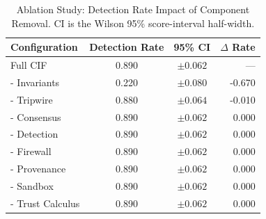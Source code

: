 \begin{table}[htbp]
\centering
\caption{Ablation Study: Detection Rate Impact of Component Removal. CI is the Wilson 95\% score-interval half-width.}
\label{tab:ablation}
\begin{tabular}{lccr}
\toprule
Configuration & Detection Rate & 95\% CI & $\Delta$ Rate \\
\midrule
Full CIF & 0.890 & $\pm 0.062$ & --- \\
\midrule
- Invariants & 0.220 & $\pm 0.080$ & -0.670 \\
- Tripwire & 0.880 & $\pm 0.064$ & -0.010 \\
- Consensus & 0.890 & $\pm 0.062$ & 0.000 \\
- Detection & 0.890 & $\pm 0.062$ & 0.000 \\
- Firewall & 0.890 & $\pm 0.062$ & 0.000 \\
- Provenance & 0.890 & $\pm 0.062$ & 0.000 \\
- Sandbox & 0.890 & $\pm 0.062$ & 0.000 \\
- Trust Calculus & 0.890 & $\pm 0.062$ & 0.000 \\
\bottomrule
\end{tabular}
\end{table}